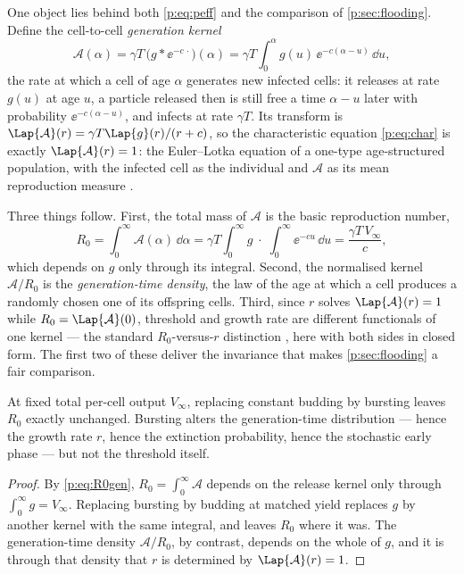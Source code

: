 One object lies behind both \cref{p:eq:peff} and the comparison of
\cref{p:sec:flooding}. Define the cell-to-cell \emph{generation kernel}
\begin{equation}
\mathcal A(\alpha)
=\gamma T\,\bigl(g*\ee^{-c\,\cdot}\bigr)(\alpha)
=\gamma T\!\int_0^\alpha g(u)\,\ee^{-c(\alpha-u)}\,\dd u,
\label{p:eq:genkernel}
\end{equation}
the rate at which a cell of age $\alpha$ generates new infected cells: it
releases at rate $g(u)$ at age $u$, a particle released then is still free a
time $\alpha-u$ later with probability $\ee^{-c(\alpha-u)}$, and infects at
rate $\gamma T$. Its transform is
$\Lap{\mathcal A}(r)=\gamma T\Lap{g}(r)/(r+c)$, so the characteristic
equation \cref{p:eq:char} is exactly $\Lap{\mathcal A}(r)=1$: the
Euler--Lotka equation of a one-type age-structured population, with the
infected cell as the individual and $\mathcal A$ as its mean reproduction
measure \cite{diekmann1990definition,metz1986dynamics}.

Three things follow. First, the total mass of $\mathcal A$ is the basic
reproduction number,
\begin{equation}
R_0=\int_0^\infty\mathcal A(\alpha)\,\dd\alpha
=\gamma T\int_0^\infty g\;\cdot\;\int_0^\infty\ee^{-cu}\,\dd u
=\frac{\gamma T\,V_\infty}{c},
\label{p:eq:R0gen}
\end{equation}
which depends on $g$ only through its integral. Second, the normalised
kernel $\mathcal A/R_0$ is the \emph{generation-time density}, the law of
the age at which a cell produces a randomly chosen one of its offspring
cells. Third, since $r$ solves $\Lap{\mathcal A}(r)=1$ while
$R_0=\Lap{\mathcal A}(0)$, threshold and growth rate are different
functionals of one kernel --- the standard $R_0$-versus-$r$ distinction
\cite{wallinga2007generation}, here with both sides in closed form. The
first two of these deliver the invariance that makes
\cref{p:sec:flooding} a fair comparison.

\begin{theorem}
\label{p:thm:R0inv}
At fixed total per-cell output $V_\infty$, replacing constant budding by
bursting leaves $R_0$ exactly unchanged. Bursting alters the generation-time
distribution --- hence the growth rate $r$, hence the extinction
probability, hence the stochastic early phase --- but not the threshold
itself.
\end{theorem}

\begin{proof}
By \cref{p:eq:R0gen}, $R_0=\int_0^\infty\mathcal A$ depends on the release
kernel only through $\int_0^\infty g=V_\infty$. Replacing bursting by
budding at matched yield replaces $g$ by another kernel with the same
integral, and leaves $R_0$ where it was. The generation-time density
$\mathcal A/R_0$, by contrast, depends on the whole of $g$, and it is
through that density that $r$ is determined by $\Lap{\mathcal A}(r)=1$.
\end{proof}


